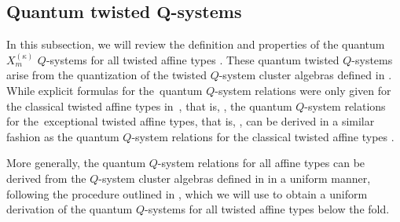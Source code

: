 \documentclass[pdftex]{sigma}
\numberwithin{equation}{section}
\begin{document}
\subsection[Quantum twisted Q-systems]{Quantum twisted $\boldsymbol{ Q}$-systems}\label{Section 4.1}

In this subsection, we will review the definition and properties of the quantum $X_m^{(\kappa)}$ $Q$-systems for all twisted affine types . These quantum twisted $Q$-systems arise from the quantization of the twisted $Q$-system cluster algebras defined in \cite{Williams15}. While explicit formulas for the~quantum  $Q$-system relations were only given for the classical twisted affine types in~\cite[equations~(4.2)--(4.4)]{DFK24}, that is, , the quantum  $Q$-system relations for the~exceptional twisted affine types, that is, , can be derived in a similar fashion as the quantum  $Q$-system relations for the classical twisted affine types .

More generally, the quantum  $Q$-system relations for all affine types  can be derived from the $Q$-system cluster algebras defined in \cite{DFK09,Kedem08,Williams15} in a uniform manner, following the procedure outlined in \cite[Remark 4.2]{DFK24}, which we will use to obtain a uniform derivation of the quantum  $Q$-systems for all twisted affine types  below the fold.
\end{document}
